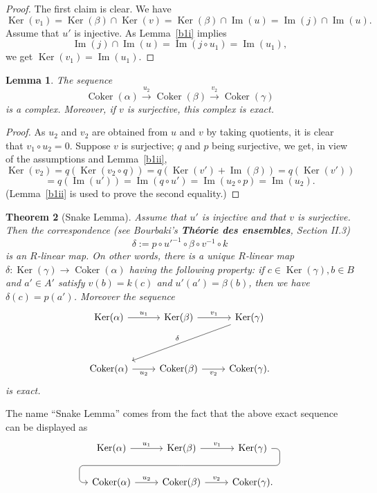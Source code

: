 \documentclass[parskip=half,fontsize=12pt]{scrartcl}%
\newcommand{\oo}{\operatorname}\newcommand{\ooo}{\operatorname*}
\newcommand{\Ker}{\operatorname{Ker}}\newcommand{\Coker}{\operatorname{Coker}}
\newcommand{\xr}{\xrightarrow}
\newtheorem{thm}{Theorem}%
\newtheorem{lem}[thm]{Lemma}
\begin{document}
\begin{proof}
The first claim is clear. We have 
$$
\oo{Ker}(v_1)=\oo{Ker}(\beta)\cap\oo{Ker}(v)=\oo{Ker}(\beta)\cap\oo{Im}(u)=\oo{Im}(j)\cap\oo{Im}(u).
$$ 
Assume that $u'$ is injective. As Lemma~\ref{b1i} implies 
$$
\oo{Im}(j)\cap\oo{Im}(u)=\oo{Im}(j\circ u_1)=\oo{Im}(u_1),
$$ 
we get $\oo{Ker}(v_1)=\oo{Im}(u_1)$.
\end{proof}

\begin{lem}\label{b2ii}
The sequence 
$$
\oo{Coker}(\alpha)\xr{u_2}\oo{Coker}(\beta)\xr{v_2}\oo{Coker}(\gamma)
$$ 
is a complex. Moreover, if $v$ is surjective, this complex is exact.
\end{lem}

\begin{proof}
As $u_2$ and $v_2$ are obtained from $u$ and $v$ by taking quotients, it is clear that $v_1\circ u_2=0$. Suppose $v$ is surjective; $q$ and $p$ being surjective, we get, in view of the assumptions and Lemma~\ref{b1ii},
$$
\oo{Ker}(v_2) = q(\oo{Ker}(v_2\circ q))= q(\oo{Ker}(v')+\oo{Im}(\beta))=q(\oo{Ker}(v'))
$$ 
$$
=q(\oo{Im}(u'))=\oo{Im}(q\circ u')=\oo{Im}(u_2\circ p)=\oo{Im}(u_2).
$$ 
(Lemma~\ref{b1ii} is used to prove the second equality.)
\end{proof} 

\begin{thm}[Snake Lemma]\label{lsl}
Assume that $u'$ is injective and that $v$ is surjective. Then the correspondence (see Bourbaki's \textbf{Théorie des ensembles}, Section II.3) 
$$
\delta:=p\circ u'^{-1}\circ\beta\circ v^{-1}\circ k
$$ 
is an $R$-linear map. On other words, there is a unique $R$-linear map $\delta:\oo{Ker}(\gamma)\to\oo{Coker}(\alpha)$ having the following property: if $c\in\oo{Ker}(\gamma),b\in B$ and $a'\in A'$ satisfy $v(b)=k(c)$ and $u'(a')= \beta(b)$, then we have $\delta(c)=p(a')$. Moreover the sequence 
$$
\begin{tikzcd}
\Ker(\alpha)\ar["u_1"]{r}&\Ker(\beta)\ar["v_1"]{r}&\Ker(\gamma)\ar["\delta"']{ddll}\\ \\ 
\Coker(\alpha)\ar["u_2"']{r}&\Coker(\beta)\ar["v_2"']{r}&\Coker(\gamma).
\end{tikzcd}
$$ 
is exact.
\end{thm}

The name ``Snake Lemma'' comes from the fact that the above exact sequence can be displayed as 
$$%
\begin{tikzcd}
  \Ker(\alpha) \ar["u_1"]{r} & \Ker(\beta) \ar["v_1"]{r}
             \ar[draw=none]{d}[name=X, anchor=center]{}
    & \Ker(\gamma) \ar[rounded corners,
            to path={ -- ([xshift=2ex]\tikztostart.east)
                      |- (X.center) \tikztonodes
                      -| ([xshift=-2ex]\tikztotarget.west)
                      -- (\tikztotarget)}]{dll}[at end]{} \\      
  \Coker(\alpha) \ar["u_2"]{r} & \Coker(\beta) \ar["v_2"]{r} & \Coker(\gamma).
\end{tikzcd}
$$
\end{document}
